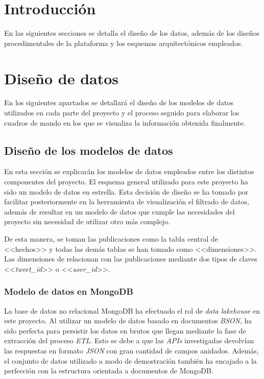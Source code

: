 
\section{Introducción}

En las siguientes secciones se detalla el diseño de los datos, además de los diseños procedimentales de la plataforma y los esquemas arquitectónicos empleados.

\section{Diseño de datos}

En los siguientes apartados se detallará el diseño de los modelos de datos utilizados en cada parte del proyecto y el proceso seguido para elaborar los cuadros de mando en los que se visualiza la información obtenida finalmente.

\subsection{Diseño de los modelos de datos}

En esta sección se explicarán los modelos de datos empleados entre los distintos componentes del proyecto. El esquema general utilizado para este proyecto ha sido un modelo de datos en estrella. Esta decisión de diseño se ha tomado por facilitar posteriormente en la herramienta de visualización el filtrado de datos, además de resultar en un modelo de datos que cumple las necesidades del proyecto sin necesidad de utilizar otro más complejo.

De esta manera, se toman las publicaciones como la tabla central de <<hechos>> y todas las demás tablas se han tomado como <<dimensiones>>. Las dimensiones de relacionan con las publicaciones mediante dos tipos de claves <<\textit{tweet\_id}>> o <<\textit{user\_id}>>.

\subsubsection{Modelo de datos en MongoDB} \label{section:mongodb_schema}

La base de datos no relacional MongoDB ha efectuado el rol de \textit{data lakehouse} en este proyecto. Al utilizar un modelo de datos basado en documentos \textit{BSON}, ha sido perfecta para persistir los datos en brutos que llegan mediante la fase de extracción del proceso \textit{ETL}. Esto se debe a que las \textit{APIs} investigadas devolvían las respuestas en formato \textit{JSON} con gran cantidad de campos anidados. Además, el conjunto de datos utilizado a modo de demostración también ha encajado a la perfección con la estructura orientada a documentos de MongoDB.

